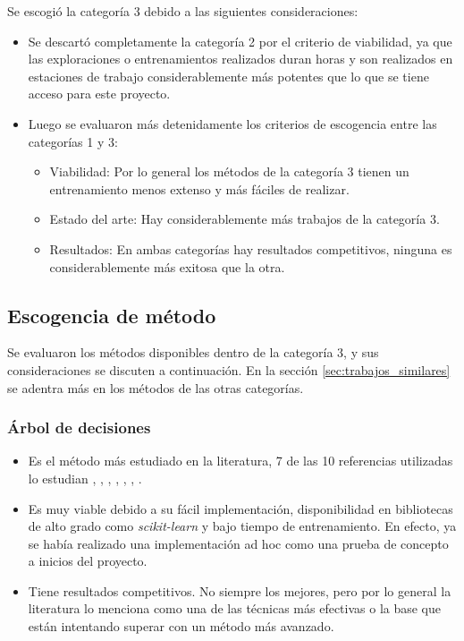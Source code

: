 Se escogió la categoría 3 debido a las siguientes consideraciones:

\begin{itemize}
    \item Se descartó completamente la categoría 2 por el criterio de
      viabilidad, ya que las exploraciones o entrenamientos realizados duran
      horas y son realizados en estaciones de trabajo considerablemente más
      potentes que lo que se tiene acceso para este proyecto.
    \item Luego se evaluaron más detenidamente los criterios de escogencia entre
      las categorías 1 y 3:
    \begin{itemize}
        \item Viabilidad: Por lo general los métodos de la categoría 3 tienen
          un entrenamiento menos extenso y más fáciles de realizar.
        \item Estado del arte: Hay considerablemente más trabajos de la
          categoría 3.
        \item Resultados: En ambas categorías hay resultados competitivos,
          ninguna es considerablemente más exitosa que la otra.
    \end{itemize}
\end{itemize}

\subsection{Escogencia de método}

Se evaluaron los métodos disponibles dentro de la categoría 3, y sus
consideraciones se discuten a continuación. En la sección
\ref{sec:trabajos_similares} se adentra más en los métodos de las otras
categorías.

\subsubsection{Árbol de decisiones}

\begin{itemize}
    \item Es el método más estudiado en la literatura, 7 de las 10 referencias
      utilizadas lo estudian \cite{de_abreu_fast_2021},
      \cite{miyasaka_logic_2021}, \cite{rai_logic_2021},
      \cite{zeng_sampling-based_2021}, \cite{huang_circuit_2023},
      \cite{hu_optdtals_2024}, \cite{prats_ramos_impact_2024}.
    \item Es muy viable debido a su fácil implementación, disponibilidad en
      bibliotecas de alto grado como \emph{scikit-learn} y bajo tiempo de
      entrenamiento. En efecto, ya se había realizado una implementación ad hoc
      como una prueba de concepto a inicios del proyecto.
    \item Tiene resultados competitivos. No siempre los mejores, pero por lo
      general la literatura lo menciona como una de las técnicas más efectivas
      o la base que están intentando superar con un método más avanzado.
\end{itemize}

